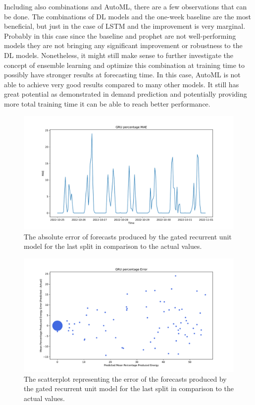 Including also combinations and AutoML, there are a few observations that can be done.
The combinations of DL models and the one-week baseline are the most beneficial, but just in the case of LSTM and the improvement is very marginal.
Probably in this case since the baseline and prophet are not well-performing models they are not bringing any significant improvement or robustness to the DL models.
Nonetheless, it might still make sense to further investigate the concept of ensemble learning and optimize this combination at training time to possibly have stronger results at forecasting time.
In this case, AutoML is not able to achieve very good results compared to many other models.
It still has great potential as demonstrated in demand prediction and potentially providing more total training time it can be able to reach better performance.

\begin{figure}[H]
\centering
\includegraphics[width=1\textwidth]{images/production/GRU_percentage_mae}
\caption{The absolute error of forecasts produced by the gated recurrent unit model for the last split in comparison to the actual values.}
\label{fig:productiongruhourlyforecastsmae}
\end{figure}

\begin{figure}[H]
\centering
\includegraphics[width=1\textwidth]{images/production/GRU_percentage_error_scatter_plot_predicted}
\caption{The scatterplot representing the error of the forecasts produced by the gated recurrent unit model for the last split in comparison to the actual values.}
\label{fig:productiongruhourlyforecastsscatterplot}
\end{figure}

